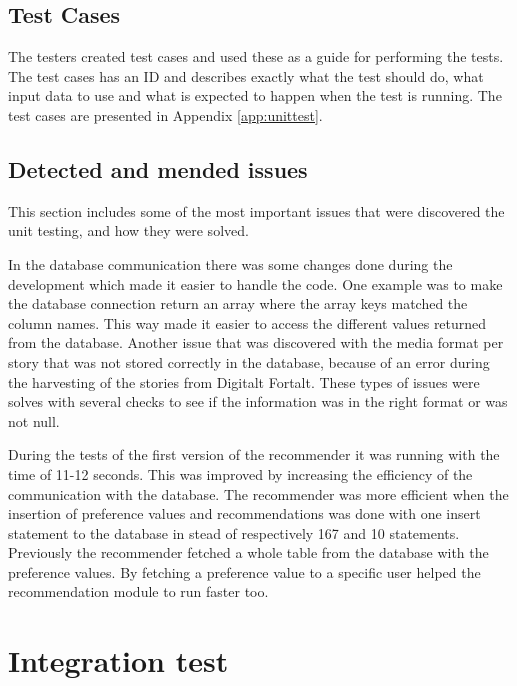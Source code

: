 \subsection{Test Cases}
The testers created test cases and used these as a guide for performing the tests. The test cases has an ID and describes exactly what the test should do, what input data to use and what is expected to happen when the test is running. The test cases are presented in Appendix \ref{app:unittest}.

\subsection{Detected and mended issues}
This section includes some of the most important issues that were discovered the unit testing, and how they were solved. 

In the database communication there was some changes done during the development which made it easier to handle the code. One example was to make the database connection return an array where the array keys matched the column names. This way made it easier to access the different values returned from the database.  
Another issue that was discovered with the media format per story that was not stored correctly in the database, because of an error during the harvesting of the stories from Digitalt Fortalt. These types of issues were solves with several checks to see if the information was in the right format or was not null. 

During the tests of the first version of the recommender it was running with the time of 11-12 seconds. This was improved by increasing the efficiency of the communication with the database. The recommender was more efficient when the insertion of preference values and recommendations was done with one insert statement to the database in stead of respectively 167 and 10 statements. Previously the recommender fetched a whole table from the database with the preference values. By fetching a preference value to a specific user helped the recommendation module to run faster too.




\section{Integration test}
\label{sec:integration_testing}

